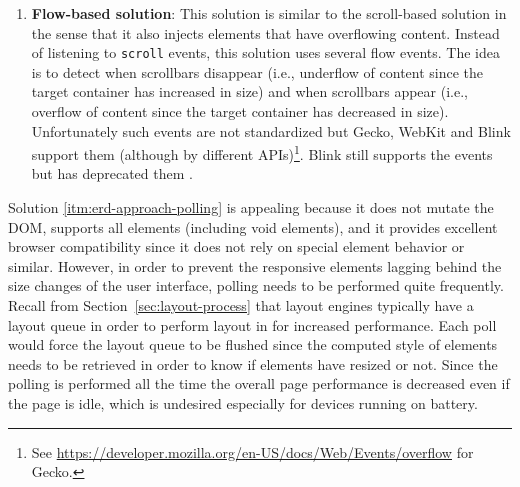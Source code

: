 \documentclass[a4paper,11pt]{kth-mag}
\newcommand{\code}[1]{\texttt{#1}}
\begin{document}
\begin{enumerate}
            For detecting when the target \gls{element} shrinks, two \glspl{element} are needed; one for handling the scrollbars and one for causing them to scroll.
            Similarly, for detecting when the target \gls{element} expands, two \glspl{element} are needed in the same way.
            A container \gls{element} is injected that contains the four \glspl{element} and make sure that they match the size of the target \gls{element}.
          \item\label{itm:erd-approach-flow}
            \textbf{Flow-based solution}:
            This solution is similar to the scroll-based solution in the sense that it also injects \glspl{element} that have overflowing content.
            Instead of listening to \code{scroll} events, this solution uses several flow events.
            The idea is to detect when scrollbars disappear (i.e., underflow of content since the target container has increased in size) and when scrollbars appear (i.e., overflow of content since the target container has decreased in size).
            Unfortunately such events are not standardized but \gls{Gecko}, \gls{WebKit} and \gls{Blink} support them (although by different \glspl{API})\footnote{See \url{https://developer.mozilla.org/en-US/docs/Web/Events/overflow} for \gls{Gecko}.}.
            \gls{Blink} still supports the events but has deprecated them \cite{blink_deprecated_flow_events}.
        \end{enumerate}
        Solution \ref{itm:erd-approach-polling} is appealing because it does not mutate the \gls{DOM}, supports all \glspl{element} (including void \glspl{element}), and it provides excellent \gls{browser} compatibility since it does not rely on special \gls{element} behavior or similar.
        However, in order to prevent the \gls{responsive} \glspl{element} lagging behind the size changes of the user interface, polling needs to be performed quite frequently.
        Recall from Section~\ref{sec:layout-process} that \glspl{layout engine} typically have a layout queue in order to perform layout in  for increased performance.
        Each poll would force the layout queue to be flushed since the computed style of \glspl{element} needs to be retrieved in order to know if \glspl{element} have resized or not.
        Since the polling is performed all the time the overall page performance is decreased even if the page is idle, which is undesired especially for devices running on battery.
\end{document}

